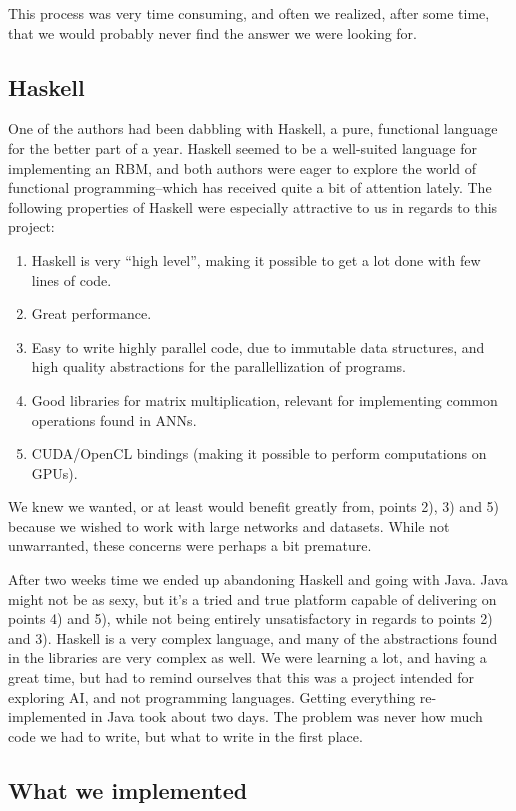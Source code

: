\documentclass[11pt]{article}
\begin{document}
This process was very time consuming, and often we realized, after some time, that we would probably never find the answer we were looking for.
\subsection{Haskell}

One of the authors had been dabbling with Haskell, a pure, functional language for the better part of a year.  Haskell seemed to be a well-suited language for implementing an RBM, and both authors were eager to explore the world of functional programming--which has received quite a bit of attention lately.  The following properties of Haskell were especially attractive to us in regards to this project:
\begin{enumerate}
 \item Haskell is very ``high level'', making it possible to get a lot done with few lines of code.
 \item Great performance.
 \item Easy to write highly parallel code, due to immutable data structures, and high quality abstractions for the parallellization of programs.
 \item Good libraries for matrix multiplication, relevant for implementing common operations found in ANNs.
 \item CUDA/OpenCL bindings (making it possible to perform computations on GPUs).
\end{enumerate}

We knew we wanted, or at least would benefit greatly from, points 2), 3) and 5) because we wished to work with large networks and datasets.  While not unwarranted, these concerns were perhaps a bit premature.

After two weeks time we ended up abandoning Haskell and going with Java.  Java might not be as sexy, but it's a tried and true platform capable of delivering on points 4) and 5), while not being entirely unsatisfactory in regards to points 2) and 3).  Haskell is a very complex language, and many of the abstractions found in the libraries are very complex as well.  We were learning a lot, and having a great time, but had to remind ourselves that this was a project intended for exploring AI, and not programming languages.  Getting everything re-implemented in Java took about two days.  The problem was never how much code we had to write, but what to write in the first place.

\subsection{What we implemented}
\end{document}
